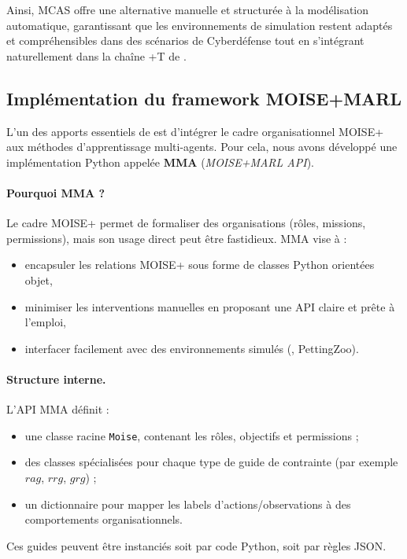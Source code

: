 Ainsi, MCAS offre une alternative manuelle et structurée à la modélisation automatique, garantissant que les environnements de simulation restent adaptés et compréhensibles dans des scénarios de Cyberdéfense tout en s'intégrant naturellement dans la chaîne +T de .


\subsection{Implémentation du framework MOISE+MARL}

L'un des apports essentiels de \footnotemark[1] est d'intégrer le cadre organisationnel MOISE+ aux méthodes d'apprentissage multi-agents. Pour cela, nous avons développé une implémentation Python appelée \textbf{MMA} (\textit{MOISE+MARL API})\footnotemark[2].



\paragraph{Pourquoi MMA ?}
Le cadre MOISE+ permet de formaliser des organisations (rôles, missions, permissions), mais son usage direct peut être fastidieux. MMA vise à :
\begin{itemize}
  \item encapsuler les relations MOISE+ sous forme de classes Python orientées objet,
  \item minimiser les interventions manuelles en proposant une API claire et prête à l'emploi,
  \item interfacer facilement avec des environnements simulés (, PettingZoo).
\end{itemize}

\paragraph{Structure interne.}
L'API MMA définit :
\begin{itemize}
  \item une classe racine \texttt{Moise}, contenant les rôles, objectifs et permissions ;
  \item des classes spécialisées pour chaque type de guide de contrainte (par exemple $rag$, $rrg$, $grg$) ;
  \item un dictionnaire pour mapper les labels d'actions/observations à des comportements organisationnels.
\end{itemize}
Ces guides peuvent être instanciés soit par code Python, soit par règles JSON.

